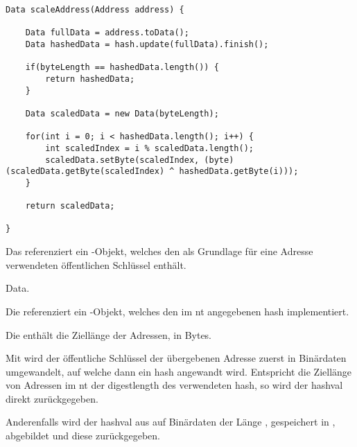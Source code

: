 \label{dcl-addr-scaling-cnet}
\javalisting
\begin{lstlisting}[caption={Adressverkürzung im \gls*{cnt} (Java)},captionpos=b]
Data scaleAddress(Address address) {

	Data fullData = address.toData();
	Data hashedData = hash.update(fullData).finish();

	if(byteLength == hashedData.length()) {
		return hashedData;
	}

	Data scaledData = new Data(byteLength);

	for(int i = 0; i < hashedData.length(); i++) {
		int scaledIndex = i % scaledData.length();
		scaledData.setByte(scaledIndex, (byte)(scaledData.getByte(scaledIndex) ^ hashedData.getByte(i)));
	}

	return scaledData;

}
\end{lstlisting}

\begin{description}

		Das \javaarg {} referenziert ein -Objekt, welches den
		als Grundlage für eine Adresse verwendeten öffentlichen Schlüssel enthält.

		\glsdesc{Data}.

		Die \javainstvar {} referenziert ein -Objekt, welches den
		im \gls{nt} angegebenen \gls{hash} implementiert.

		Die \javainstvar {} enthält die Ziellänge der Adressen, in Bytes.

\end{description}

Mit  wird der öffentliche Schlüssel der übergebenen Adresse zuerst in Binärdaten
umgewandelt, auf welche dann ein \gls{hash} angewandt wird. Entspricht die Ziellänge von Adressen im
\gls{nt} der \gls{digestlength} des verwendeten \gls{hash}, so wird der \gls{hashval} 
direkt zurückgegeben.

Anderenfalls wird der \gls{hashval} aus  auf Binärdaten der Länge ,
gespeichert in , abgebildet und diese zurückgegeben.
